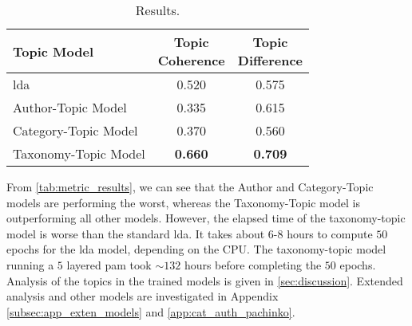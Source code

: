 \begin{table}[h]
	\centering
	\caption{Results.}
	\begin{tabular}{l|c|c}
		Topic Model & \makecell{Topic \\ Coherence} & \makecell{Topic \\ Difference} \\
		\midrule
		\Acrlong{lda} & 0.520 & 0.575 \\
		Author-Topic Model & 0.335 & 0.615 \\
		Category-Topic Model & 0.370 & 0.560 \\
		Taxonomy-Topic Model & \textbf{0.660} & \textbf{0.709} \\
	\end{tabular}
	\label{tab:metric_results}
\end{table}

From \autoref{tab:metric_results}, we can see that the Author and Category-Topic models are performing the worst, whereas the Taxonomy-Topic model is outperforming all other models.
However, the elapsed time of the taxonomy-topic model is worse than the standard \gls{lda}.
It takes about $6$-$8$ hours to compute $50$ epochs for the \gls{lda} model, depending on the CPU. 
The taxonomy-topic model running a $5$ layered \gls{pam} took ${\sim}132$ hours before completing the $50$ epochs.
Analysis of the topics in the trained models is given in \autoref{sec:discussion}.
Extended analysis and other models are investigated in Appendix \autoref{subsec:app_exten_models} and \autoref{app:cat_auth_pachinko}.
